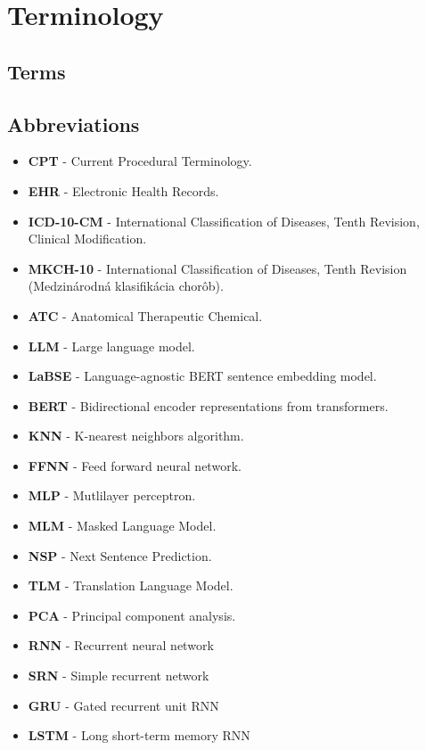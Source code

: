 
\chapter*{Terminology}

\section*{Terms}

    \setlength\itemsep{1px}

\section*{Abbreviations}

\begin{itemize}
    \setlength\itemsep{1px}
    \item \textbf{CPT} - Current Procedural Terminology.
    \item \textbf{EHR} - Electronic Health Records.
    \item \textbf{ICD-10-CM} - International Classification of Diseases, Tenth Revision, Clinical Modification.
    \item \textbf{MKCH-10} - International Classification of Diseases, Tenth Revision (Medzinárodná klasifikácia chorôb).
    \item \textbf{ATC} - Anatomical Therapeutic Chemical.
    \item \textbf{LLM} - Large language model. 
    \item \textbf{LaBSE} - Language-agnostic BERT sentence embedding model.
    \item \textbf{BERT} - Bidirectional encoder representations from transformers.
    \item \textbf{KNN} - K-nearest neighbors algorithm.
    \item \textbf{FFNN} - Feed forward neural network.
    \item \textbf{MLP} - Mutlilayer perceptron.
    \item \textbf{MLM} - Masked Language Model.
    \item \textbf{NSP} - Next Sentence Prediction. 
    \item \textbf{TLM} - Translation Language Model.
    \item \textbf{PCA} - Principal component analysis.
    \item \textbf{RNN} - Recurrent neural network
    \item \textbf{SRN} - Simple recurrent network
    \item \textbf{GRU} - Gated recurrent unit RNN
    \item \textbf{LSTM} - Long short-term memory RNN
\end{itemize}



